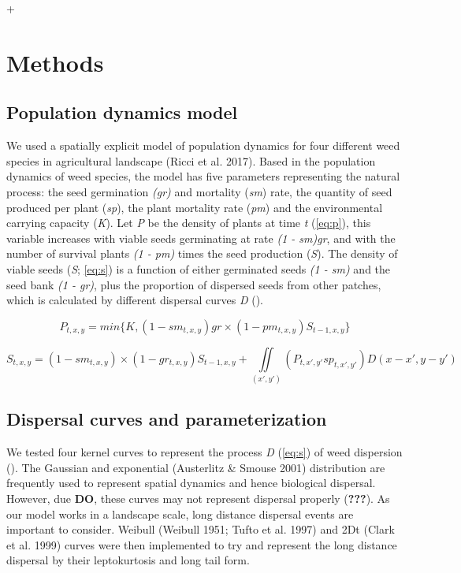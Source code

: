 +\documentclass[12pt]{article}
\begin{document}
\section{Methods}\label{methods}

\subsection{Population dynamics model}\label{population-dynamics-model}

We used a spatially explicit model of population dynamics for four
different weed species in agricultural landscape (Ricci et al. 2017).
Based in the population dynamics of weed species, the model has five
parameters representing the natural process: the seed germination
\emph{(gr)} and mortality (\emph{sm}) rate, the quantity of seed
produced per plant (\emph{sp}), the plant mortality rate (\emph{pm}) and
the environmental carrying capacity (\emph{K}). Let \emph{P} be the
density of plants at time \emph{t} (\cref{eq:p}), this
variable increases with viable seeds germinating at rate \emph{(1 -
sm)gr}, and with the number of survival plants \emph{(1 - pm)} times the
seed production (\emph{S}). The density of viable seeds (\emph{S};
\cref{eq:s}) is a function of either germinated seeds
\emph{(1 - sm)} and the seed bank \emph{(1 - gr)}, plus the proportion
of dispersed seeds from other patches, which is calculated by different
dispersal curves \emph{D} ().

\begin{equation} P_{t,x,y} = min\{K,(1 - sm_{t,x,y})gr\times(1 - pm_{t,x,y})S_{t-1,x,y}\} \label{eq:p}\end{equation}

\begin{equation} S_{t,x,y} = (1 - sm_{t,x,y})\times(1 - gr_{t,x,y})S_{t-1,x,y} + \iint\limits_{(x',y')} (P_{t,x',y'}sp_{t,x',y'})D(x - x', y - y') \label{eq:s}\end{equation}

\subsection{Dispersal curves and
parameterization}\label{dispersal-curves-and-parameterization}

We tested four kernel curves to represent the process \emph{D}
(\cref{eq:s}) of weed dispersion
(). The Gaussian and exponential
(Austerlitz \& Smouse 2001) distribution are frequently used to
represent spatial dynamics and hence biological dispersal. However, due
\textbf{DO}, these curves may not represent dispersal properly
({\textbf{???}}). As our model works in a landscape scale, long distance
dispersal events are important to consider. Weibull (Weibull 1951; Tufto
et al. 1997) and 2Dt (Clark et al. 1999) curves were then implemented to
try and represent the long distance dispersal by their leptokurtosis and
long tail form.
\end{document}
